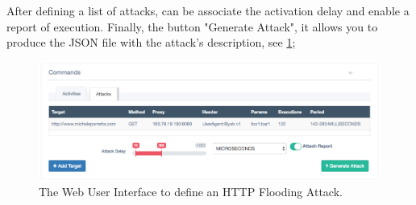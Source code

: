 After defining a list of attacks, can be associate the activation delay and enable a report of execution. Finally, the button "Generate Attack", it allows you to produce the JSON file with the attack's description, see \ref{fig:attack-wui};

\begin{figure}[tp]
  \centering
  \includegraphics[scale=0.45]{./fig/attackWUI.png}
  \caption{The Web User Interface to define an HTTP Flooding Attack.}
    \label{fig:attack-wui}
\end{figure}
